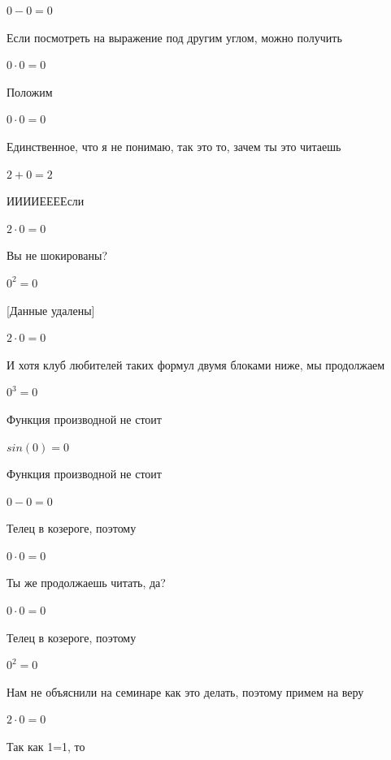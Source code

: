 \documentclass[12pt,a4paper,fleqn]{article}
\begin{document}
\begin{center}$0-0 = 0$\end{center}
Если посмотреть на выражение под другим углом, можно получить

\begin{center}$0 \cdot 0 = 0$\end{center}
Положим

\begin{center}$0 \cdot 0 = 0$\end{center}
Единственное, что я не понимаю, так это то, зачем ты это читаешь

\begin{center}$2+0 = 2$\end{center}
ИИИИЕЕЕЕсли\cite{link3}

\begin{center}$2 \cdot 0 = 0$\end{center}
Вы не шокированы?\cite{link3}

\begin{center}$0^{2} = 0$\end{center}
[Данные удалены]

\begin{center}$2 \cdot 0 = 0$\end{center}
И хотя клуб любителей таких формул двумя блоками ниже, мы продолжаем

\begin{center}$0^{3} = 0$\end{center}
Функция производной не стоит\cite{link2}

\begin{center}$sin(0) = 0$\end{center}
Функция производной не стоит\cite{link2}

\begin{center}$0-0 = 0$\end{center}
Телец в козероге, поэтому

\begin{center}$0 \cdot 0 = 0$\end{center}
Ты же продолжаешь читать, да?

\begin{center}$0 \cdot 0 = 0$\end{center}
Телец в козероге, поэтому

\begin{center}$0^{2} = 0$\end{center}
Нам не объяснили на семинаре как это делать, поэтому примем на веру

\begin{center}$2 \cdot 0 = 0$\end{center}
Так как 1=1, то\cite{link4}
\end{document}
